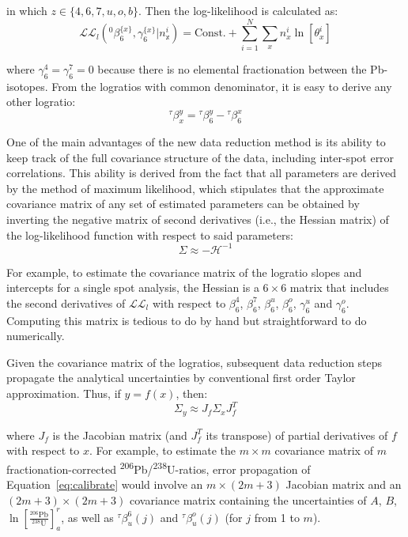 \documentclass{article}
\begin{document}
\noindent in which $z\in\{4,6,7,u,o,b\}$. Then the log-likelihood is
calculated as:
\begin{equation}
  \mathcal{LL}_l\left({}^{0}\!\beta_{6}^{\{x\}},\gamma_{6}^{\{x\}}|n_{\mathbb{x}}^i\right)
  = \mbox{Const.} + \sum\limits_{i=1}^{N}\underset{x}{\sum} n_x^i
  \ln[{\theta}_x^i]
\end{equation}

\noindent where $\gamma_6^4=\gamma_6^7=0$ because there is no
elemental fractionation between the Pb-isotopes. From the logratios
with common denominator, it is easy to derive any other logratio:
\begin{equation}
  {}^{\tau}\!\beta_{x}^{y} = {}^{\tau}\!\beta_{6}^{y} - {}^{\tau}\!\beta_{6}^{x}
\end{equation}

One of the main advantages of the new data reduction method is its
ability to keep track of the full covariance structure of the data,
including inter-spot error correlations. This ability is derived from
the fact that all parameters are derived by the method of maximum
likelihood, which stipulates that the approximate covariance matrix of
any set of estimated parameters can be obtained by inverting the
negative matrix of second derivatives (i.e., the Hessian matrix) of
the log-likelihood function with respect to said parameters:
\begin{equation}
  \Sigma \approx -\mathcal{H}^{-1}
\end{equation}

For example, to estimate the covariance matrix of the logratio slopes
and intercepts for a single spot analysis, the Hessian is a
${6}\times{6}$ matrix that includes the second derivatives of
$\mathcal{LL}_l$ with respect to $\beta_6^4$, $\beta_6^7$,
$\beta_6^u$, $\beta_6^o$, $\gamma_6^u$ and $\gamma_6^o$. Computing
this matrix is tedious to do by hand but straightforward to do
numerically.\medskip

Given the covariance matrix of the logratios, subsequent data
reduction steps propagate the analytical uncertainties by conventional
first order Taylor approximation. Thus, if $y = f(x)$, then:
\begin{equation}
  \Sigma_{y} \approx J_f \Sigma_{x} J_f^T
\end{equation}

\noindent where $J_f$ is the Jacobian matrix (and $J_f^T$ its
transpose) of partial derivatives of $f$ with respect to $x$. For
example, to estimate the ${m}\times{m}$ covariance matrix of $m$
fractionation-corrected
\textsuperscript{206}Pb/\textsuperscript{238}U-ratios, error
propagation of Equation~\ref{eq:calibrate} would involve an
$m\times(2m+3)$ Jacobian matrix and an $(2m+3)\times(2m+3)$ covariance
matrix containing the uncertainties of $A$, $B$,
$\ln\!\left[\frac{{}^{206}\mbox{Pb}}{{}^{238}\mbox{U}}\right]^{\!r}_{\!a}$,
as well as ${}^{\tau}\!\beta_{u}^{6}(j)$ and
${}^{\tau}\!\beta_{u}^{o}(j)$ (for $j$ from 1 to $m$).
\end{document}

